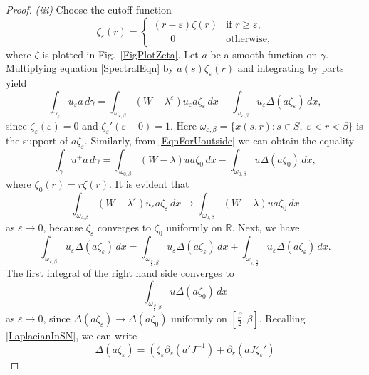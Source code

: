 \documentclass[reqno]{amsart}
\theoremstyle{plain}
\numberwithin{equation}{section}
\newcommand{\Real}{\mathbb R}
\newcommand{\eps}{\varepsilon}
\renewcommand{\geq}{\geqslant}
\begin{document}
\begin{proof}
\textit{(iii)}
Choose the  cutoff function
\begin{equation*}
  \zeta_\eps(r)=
  \begin{cases}
    (r-\eps)\zeta(r) & \text{if } r\geq \eps,\\
    \phantom{mm}0 &\text{otherwise,}
  \end{cases}
\end{equation*}
where $\zeta$ is  plotted in Fig.~\ref{FigPlotZeta}.
Let $a$ be a smooth function on $\gamma$.
Multiplying equation \eqref{SpectralEqn} by $a(s)\zeta_\eps(r)$ and integrating by parts yield
\begin{equation}\label{IntUepsDg}
  \int_{\gamma_\eps} u_\eps a \,d\gamma=\int_{\omega_{\eps,\beta}} (W-\lambda^\eps)u_\eps a\zeta_\eps\,dx-\int_{\omega_{\eps,\beta}} u_\eps \Delta (a\zeta_\eps)\,dx,
\end{equation}
since $\zeta_\eps(\eps)=0$ and $\zeta_\eps'(\eps+0)=1$. Here $\omega_{\eps,\beta}=\{x(s,r)\colon s\in S,\; \eps<r<\beta\}$
is the support of $a\zeta_\eps$.
Similarly, from \eqref{EqnForUoutside} we can obtain the equality
 \begin{equation}\label{IntUDg}
  \int_{\gamma} u^+ a \,d\gamma=\int_{\omega_{0,\beta}} (W-\lambda)u a\zeta_0\,dx-\int_{\omega_{0,\beta}} u \Delta (a\zeta_0)\,dx,
\end{equation}
where $\zeta_0(r)=r\zeta(r)$.
It is evident that
\begin{equation}\label{IntWlmb}
   \int_{\omega_{\eps,\beta}} (W-\lambda^\eps)u_\eps a\zeta_\eps\,dx\to
   \int_{\omega_{0,\beta}} (W-\lambda)u a\zeta_0\,dx
\end{equation}
as $\eps\to 0$, because $\zeta_\eps$ converges to $\zeta_0$ uniformly on $\Real$. Next, we have
\begin{equation*}
  \int_{\omega_{\eps,\beta}} u_\eps \Delta (a\zeta_\eps)\,dx=\int_{\omega_{\frac\beta2,\beta}} u_\eps \Delta (a\zeta_\eps)\,dx+\int_{\omega_{\eps,\frac\beta2}} u_\eps \Delta (a\zeta_\eps)\,dx.
\end{equation*}
The first integral of the right hand side converges to
\begin{equation*}
  \int_{\omega_{\frac\beta2,\beta}} u \Delta (a\zeta_0)\,dx
\end{equation*}
as $\eps\to 0$, since $\Delta (a\zeta_\eps)\to \Delta (a\zeta_0)$ uniformly on $[\frac\beta2,\beta]$.
Recalling \eqref{LaplacianInSN}, we can write
\begin{equation*}
  \Delta (a\zeta_\eps)=\left(
  \zeta_\eps\partial_s(a'J^{-1})+ \partial_r(aJ\zeta_\eps')

\end{equation*}
\end{proof}
\end{document}
